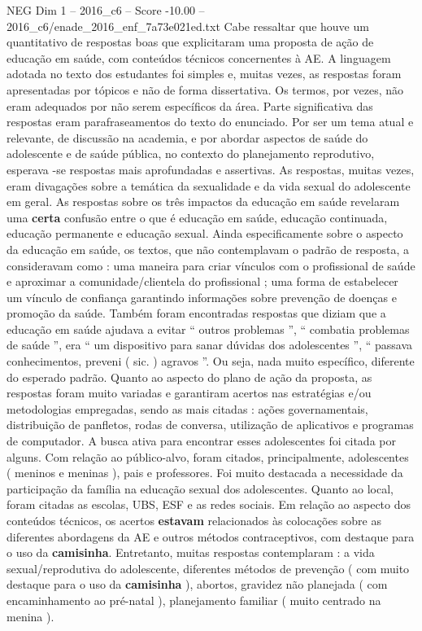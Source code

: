\begin{textsample}{NEG Dim 1 – 2016\_c6 – Score -10.00 – 2016\_c6/enade\_2016\_enf\_7a73e021ed.txt}
Cabe ressaltar que houve um quantitativo de respostas boas que explicitaram uma proposta de ação de educação em saúde, com conteúdos técnicos concernentes à AE.
A linguagem adotada no texto dos estudantes foi simples e, muitas vezes, as respostas foram apresentadas por tópicos e não de forma dissertativa.
Os termos, por vezes, não eram adequados por não serem específicos da área.
Parte significativa das respostas eram parafraseamentos do texto do enunciado.
Por ser um tema atual e relevante, de discussão na academia, e por abordar aspectos de saúde do adolescente e de saúde pública, no contexto do planejamento reprodutivo, esperava -se respostas mais aprofundadas e assertivas.
As respostas, muitas vezes, eram divagações sobre a temática da sexualidade e da vida sexual do adolescente em geral.
As respostas sobre os três impactos da educação em saúde revelaram uma \textbf{certa} confusão entre o que é educação em saúde, educação continuada, educação permanente e educação sexual.
Ainda especificamente sobre o aspecto da educação em saúde, os textos, que não contemplavam o padrão de resposta, a consideravam como : uma maneira para criar vínculos com o profissional de saúde e aproximar a comunidade/clientela do profissional ; uma forma de estabelecer um vínculo de confiança garantindo informações sobre prevenção de doenças e promoção da saúde.
Também foram encontradas respostas que diziam que a educação em saúde ajudava a evitar “ outros problemas ”, “ combatia problemas de saúde ”, era “ um dispositivo para sanar dúvidas dos adolescentes ”, “ passava conhecimentos, preveni ( sic. ) agravos ”.
Ou seja, nada muito específico, diferente do esperado padrão.
Quanto ao aspecto do plano de ação da proposta, as respostas foram muito variadas e garantiram acertos nas estratégias e/ou metodologias empregadas, sendo as mais citadas : ações governamentais, distribuição de panfletos, rodas de conversa, utilização de aplicativos e programas de computador.
A busca ativa para encontrar esses adolescentes foi citada por alguns.
Com relação ao público-alvo, foram citados, principalmente, adolescentes ( meninos e meninas ), pais e professores.
Foi muito destacada a necessidade da participação da família na educação sexual dos adolescentes.
Quanto ao local, foram citadas as escolas, UBS, ESF e as redes sociais.
Em relação ao aspecto dos conteúdos técnicos, os acertos \textbf{estavam} relacionados às colocações sobre as diferentes abordagens da AE e outros métodos contraceptivos, com destaque para o uso da \textbf{camisinha}.
Entretanto, muitas respostas contemplaram : a vida sexual/reprodutiva do adolescente, diferentes métodos de prevenção ( com muito destaque para o uso da \textbf{camisinha} ), abortos, gravidez não planejada ( com encaminhamento ao pré-natal ), planejamento familiar ( muito centrado na menina ).

\end{textsample}
